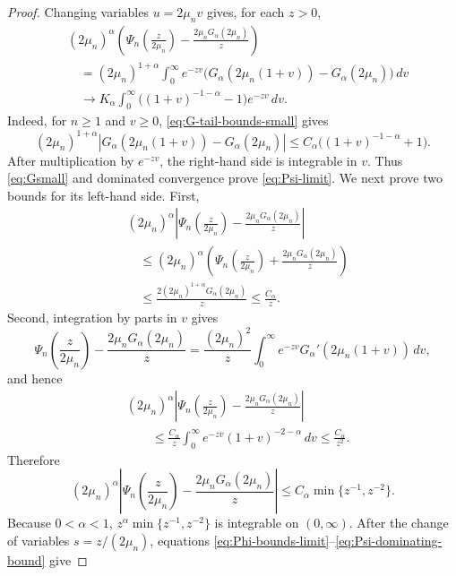 \documentclass[10pt,a4paper]{amsart}
\begin{document}
\begin{proof}
Changing variables $u=2\mu_nv$ gives, for each $z>0$,
\begin{equation}\label{eq:Psi-limit}
 \begin{aligned}
 &(2\mu_n)^\alpha\left(
 \Psi_n\left(\frac z{2\mu_n}\right)
 -\frac{2\mu_nG_\alpha(2\mu_n)}z\right)\\
 &\quad=(2\mu_n)^{1+\alpha}\int_0^\infty e^{-zv}
 \bigl(G_\alpha(2\mu_n(1+v))-G_\alpha(2\mu_n)\bigr)\,dv\\
 &\quad\longrightarrow K_\alpha\int_0^\infty
 \bigl((1+v)^{-1-\alpha}-1\bigr)e^{-zv}\,dv.
 \end{aligned}
\end{equation}
Indeed, for $n\ge1$ and $v\ge0$, \eqref{eq:G-tail-bounds-small} gives
\[
 (2\mu_n)^{1+\alpha}
 \left|G_\alpha(2\mu_n(1+v))-G_\alpha(2\mu_n)\right|
 \le C_\alpha\bigl((1+v)^{-1-\alpha}+1\bigr).
\]
After multiplication by $e^{-zv}$, the right-hand side is integrable in
$v$.  Thus \eqref{eq:Gsmall} and dominated convergence prove
\eqref{eq:Psi-limit}.  We next prove two bounds for its left-hand side.
First,
\[
 \begin{aligned}
 &(2\mu_n)^\alpha\left|
 \Psi_n\left(\frac z{2\mu_n}\right)
 -\frac{2\mu_nG_\alpha(2\mu_n)}z\right|\\
 &\quad\le(2\mu_n)^\alpha\left(
 \Psi_n\left(\frac z{2\mu_n}\right)
 +\frac{2\mu_nG_\alpha(2\mu_n)}z\right)\\
 &\quad\le\frac{2(2\mu_n)^{1+\alpha}G_\alpha(2\mu_n)}z
 \le\frac{C_\alpha}{z}.
 \end{aligned}
\]
Second, integration by parts in $v$ gives
\[
 \Psi_n\left(\frac z{2\mu_n}\right)
 -\frac{2\mu_nG_\alpha(2\mu_n)}z
 =\frac{(2\mu_n)^2}{z}\int_0^\infty
 e^{-zv}G_\alpha'(2\mu_n(1+v))\,dv,
\]
and hence
\[
 \begin{aligned}
 &(2\mu_n)^\alpha\left|
 \Psi_n\left(\frac z{2\mu_n}\right)
 -\frac{2\mu_nG_\alpha(2\mu_n)}z\right|\\
 &\qquad\le\frac{C_\alpha}{z}
 \int_0^\infty e^{-zv}(1+v)^{-2-\alpha}\,dv
 \le\frac{C_\alpha}{z^2}.
 \end{aligned}
\]
Therefore
\begin{equation}\label{eq:Psi-dominating-bound}
 (2\mu_n)^\alpha\left|
 \Psi_n\left(\frac z{2\mu_n}\right)
 -\frac{2\mu_nG_\alpha(2\mu_n)}z\right|
 \le C_\alpha\min\{z^{-1},z^{-2}\}.
\end{equation}
Because $0<\alpha<1$,
$z^\alpha\min\{z^{-1},z^{-2}\}$ is integrable on $(0,\infty)$.
After the change of variables $s=z/(2\mu_n)$, equations
\eqref{eq:Phi-bounds-limit}--\eqref{eq:Psi-dominating-bound} give

\end{proof}
\end{document}

